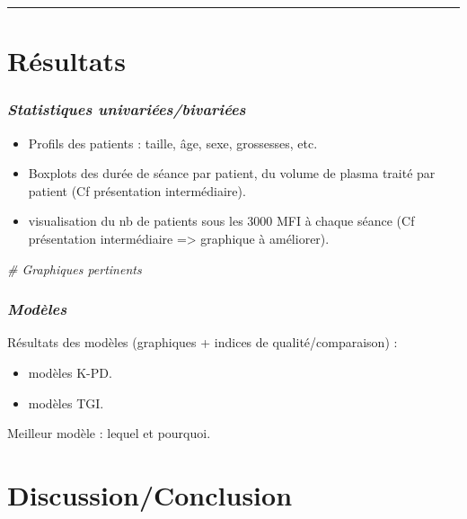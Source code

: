 \documentclass[
]{article}
\newenvironment{Shaded}{\begin{snugshade}}{\end{snugshade}}
\newcommand{\CommentTok}[1]{\textcolor[rgb]{0.56,0.35,0.01}{\textit{#1}}}
\providecommand{\tightlist}{%
  \setlength{\itemsep}{0pt}\setlength{\parskip}{0pt}}
\begin{document}
\begin{center}\rule{0.5\linewidth}{0.5pt}\end{center}

\section{\texorpdfstring{\textbf{Résultats}}{Résultats}}\label{ruxe9sultats}

\subsubsection{\texorpdfstring{\emph{Statistiques
univariées/bivariées}}{Statistiques univariées/bivariées}}\label{statistiques-univariuxe9esbivariuxe9es}

\begin{itemize}
\tightlist
\item
  Profils des patients : taille, âge, sexe, grossesses, etc.
\item
  Boxplots des durée de séance par patient, du volume de plasma traité
  par patient (Cf présentation intermédiaire).
\item
  visualisation du nb de patients sous les 3000 MFI à chaque séance (Cf
  présentation intermédiaire =\textgreater{} graphique à améliorer).
\end{itemize}

\begin{Shaded}
\begin{Highlighting}[]
\CommentTok{\# Graphiques pertinents}
\end{Highlighting}
\end{Shaded}

\subsubsection{\texorpdfstring{\emph{Modèles}}{Modèles}}\label{moduxe8les}

Résultats des modèles (graphiques + indices de qualité/comparaison) :

\begin{itemize}
\tightlist
\item
  modèles K-PD.
\item
  modèles TGI.
\end{itemize}

Meilleur modèle : lequel et pourquoi.

\section{\texorpdfstring{\textbf{Discussion/Conclusion}}{Discussion/Conclusion}}\label{discussionconclusion}
\end{document}
